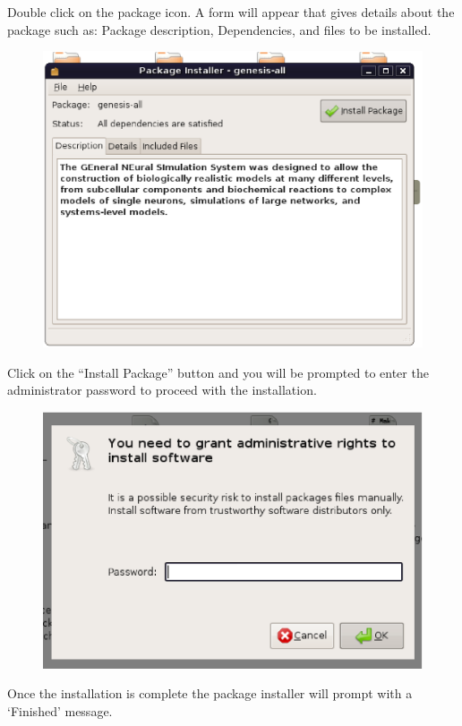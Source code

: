 \documentclass[12pt]{article}
\begin{document}
Double click on the package icon. A form will appear that gives details about the package such as: Package description, Dependencies, and files to be installed.

\begin{figure}[h]
   \centering
   \includegraphics[scale=0.5]{figures/install-user-deb-pkg.eps}
\end{figure}

\newpage

Click on the ``{\sf Install Package}'' button and you will be prompted to enter the administrator password to proceed with the installation.

\begin{figure}[h]
   \centering
   \includegraphics[scale=0.5]{figures/install-user-deb-admin.eps}
\end{figure}

Once the installation is complete the package installer will prompt with a `{\sf Finished}' message.
\end{document}
